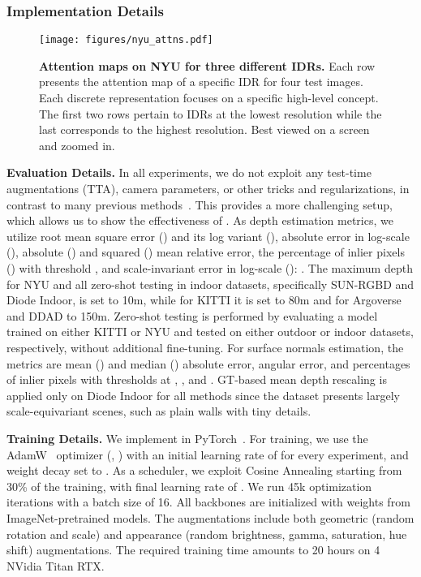 \subsubsection{Implementation Details}
\begin{figure}[]
    \centering
    \texttt{[image: figures/nyu\_attns.pdf]}\\
    \vspace{-10pt}
    \caption{\textbf{Attention maps on NYU for three different IDRs.} Each row presents the attention map of a specific IDR for four test images. Each discrete representation focuses on a specific high-level concept. The first two rows pertain to IDRs at the lowest resolution while the last corresponds to the highest resolution. Best viewed on a screen and zoomed in.}
    \label{fig:nyu_attns}
    \vspace{-10pt}
\end{figure}
\noindent{}\textbf{Evaluation Details.} In all experiments, we do not exploit any test-time augmentations (TTA), camera parameters, or other tricks and regularizations, in contrast to many previous methods~\cite{Fu2018, Lee2019, Bhat2020, Patil2022, Yuan2022}. This provides a more challenging setup, which allows us to show the effectiveness of \ourmodel. 
As depth estimation metrics, we utilize root mean square error () and its log variant (), absolute error in log-scale (), absolute () and squared () mean relative error, the percentage of inlier pixels () with threshold , and scale-invariant error in log-scale (): . The maximum depth for NYU and all zero-shot testing in indoor datasets, specifically SUN-RGBD and Diode Indoor, is set to 10m, while for KITTI it is set to 80m and for Argoverse and DDAD to 150m. Zero-shot testing is performed by evaluating a model trained on either KITTI or NYU and tested on either outdoor or indoor datasets, respectively, without additional fine-tuning. For surface normals estimation, the metrics are mean () and median () absolute error,  angular error, and percentages of inlier pixels with thresholds at , , and . GT-based mean depth rescaling is applied only on Diode Indoor for all methods since the dataset presents largely scale-equivariant scenes, such as plain walls with tiny details.

\noindent{}\textbf{Training Details.} We implement \ourmodel in PyTorch~\cite{pytorch}. For training, we use the AdamW~\cite{Loshchilov2017} optimizer (, ) with an initial learning rate of  for every experiment, and weight decay set to . As a scheduler, we exploit Cosine Annealing starting from 30\% of the training, with final learning rate of . We run 45k optimization iterations with a batch size of 16. 
All backbones are initialized with weights from ImageNet-pretrained models. The augmentations include both geometric (random rotation and scale) and appearance (random brightness, gamma, saturation, hue shift) augmentations. The required training time amounts to 20 hours on 4 NVidia Titan RTX.

